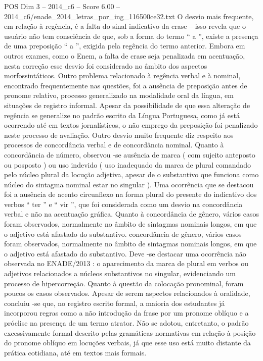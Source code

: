 \begin{textsample}{POS Dim 3 – 2014\_c6 – Score 6.00 – 2014\_c6/enade\_2014\_letras\_por\_ing\_116500ce32.txt}
O desvio mais frequente, em relação à regência, é a falta do sinal indicativo da crase – isso revela que o usuário não tem consciência de que, sob a forma do termo “ a ”, existe a presença de uma preposição “ a ”, exigida pela regência do termo anterior.
Embora em outros exames, como o Enem, a falta de crase seja penalizada em acentuação, nesta correção esse desvio foi considerado no âmbito dos aspectos morfossintáticos.
Outro problema relacionado à regência verbal e à nominal, encontrado frequentemente nas questões, foi a ausência de preposição antes de pronome relativo, processo generalizado na modalidade oral da língua, em situações de registro informal.
Apesar da possibilidade de que essa alteração de regência se generalize no padrão escrito da Língua Portuguesa, como já está ocorrendo até em textos jornalísticos, o não emprego da preposição foi penalizado neste processo de avaliação.
Outro desvio muito frequente diz respeito aos processos de concordância verbal e de concordância nominal.
Quanto à concordância de número, observou -se ausência de marca ( com sujeito anteposto ou posposto ) ou uso indevido ( uso inadequado da marca de plural comandado pelo núcleo plural da locução adjetiva, apesar de o substantivo que funciona como núcleo do sintagma nominal estar no singular ).
Uma ocorrência que se destacou foi a ausência de acento circunflexo na forma plural do presente do indicativo dos verbos “ ter ” e “ vir ”, que foi considerada como um desvio na concordância verbal e não na acentuação gráfica.
Quanto à concordância de gênero, vários casos foram observados, normalmente no âmbito de sintagmas nominais longos, em que o adjetivo está afastado do substantivo. concordância de gênero, vários casos foram observados, normalmente no âmbito de sintagmas nominais longos, em que o adjetivo está afastado do substantivo.
Deve -se destacar uma ocorrência não observada no ENADE/2013 : o aparecimento da marca de plural em verbos ou adjetivos relacionados a núcleos substantivos no singular, evidenciando um processo de hipercorreção.
Quanto à questão da colocação pronominal, foram poucos os casos observados.
Apesar de serem aspectos relacionados à oralidade, concluiu -se que, no registro escrito formal, a maioria dos estudantes já incorporou regras como a não introdução da frase por um pronome oblíquo e a próclise na presença de um termo atrator.
Não se adotou, entretanto, o padrão excessivamente formal descrito pelas gramáticas normativas em relação à posição do pronome oblíquo em locuções verbais, já que esse uso está muito distante da prática cotidiana, até em textos mais formais.

\end{textsample}
